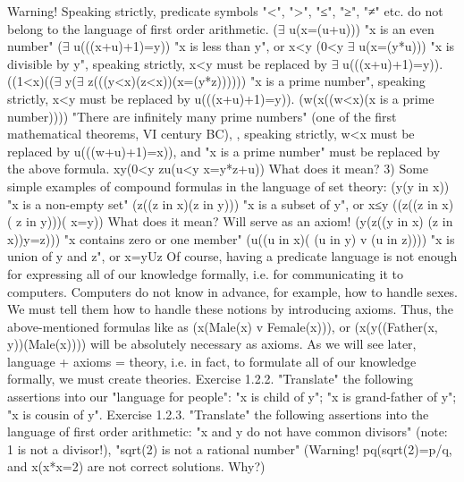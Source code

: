 Warning! Speaking strictly, predicate symbols "<", ">", "≤", "≥", "≠" etc. do not belong to the language of first order
arithmetic.
(\(\exists\) u(x=(u+u))) "x is an even number"
(\(\exists\) u(((x+u)+1)=y)) "x is less than y", or x<y
(0<y \AND  \(\exists\) u(x=(y*u))) "x is divisible by y", speaking strictly, x<y must
                     be replaced by \(\exists\) u(((x+u)+1)=y)).
((1<x)\AND (\neg (\(\exists\) y(\(\exists\) z(((y<x)\AND (z<x))\AND (x=(y*z)))))) "x is a prime number", speaking strictly, x<y
                                                must be replaced by \exists u(((x+u)+1)=y)).
(\forall w(\exists x((w<x)\AND (x is a prime number)))) "There are infinitely many prime numbers" (one
                                         of the first mathematical theorems, VI century
                                        BC), , speaking strictly, w<x must be replaced by
                                       \exists u(((w+u)+1)=x)), and "x is a prime number"
                                        must be replaced by the above formula.
\forall x\forall y(0<y \IMPLIES  \exists z\exists u(u<y \AND  x=y*z+u)) What does it mean?
3) Some simple examples of compound formulas in the language of set theory:
(\exists y(y in x)) "x is a non-empty set"
(\forall z((z in x)\IMPLIES (z in y))) "x is a subset of y", or x≤y
((\forall z((z in x)\IFF ( z in y)))\IMPLIES ( x=y)) What does it mean? Will serve as an axiom!
(\forall y(\forall z((y in x) \AND  (z in x))\IMPLIES y=z))) "x contains zero or one member"
(\forall u((u in x)\IFF ( (u in y) v (u in z)))) "x is union of y and z", or x=yUz
Of course, having a predicate language is not enough for expressing all of our knowledge formally, i.e.
for communicating it to computers. Computers do not know in advance, for example, how to handle
sexes. We must tell them how to handle these notions by introducing axioms. Thus, the above-mentioned
formulas like as (\forall x(Male(x) v Female(x))), or (\forall x(\forall y((Father(x, y))\IMPLIES (Male(x)))) will be absolutely
necessary as axioms. As we will see later, language + axioms = theory, i.e. in fact, to formulate all of our
knowledge formally, we must create theories.
Exercise 1.2.2. "Translate" the following assertions into our "language for people":
"x is child of y";
"x is grand-father of y";
"x is cousin of y".
Exercise 1.2.3. "Translate" the following assertions into the language of first order arithmetic:
"x and y do not have common divisors" (note: 1 is not a divisor!),
"sqrt(2) is not a rational number"
(Warning! \neg \exists p\exists q(sqrt(2)=p/q, and \exists x(x*x=2) are not correct solutions. Why?)
